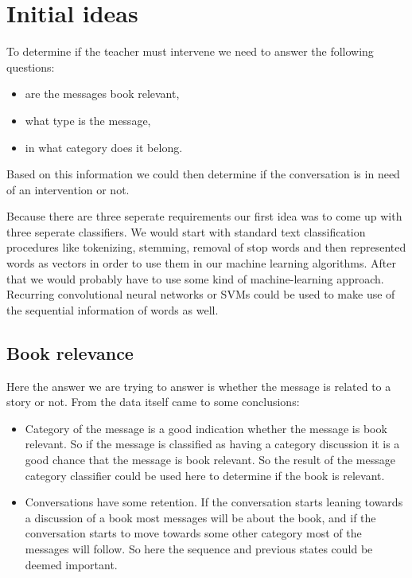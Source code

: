 \documentclass[11pt,a4paper]{article}
\begin{document}
\section{Initial ideas}

To determine if the teacher must intervene we need to answer the following questions:
\begin{itemize}
\item{are the messages book relevant,}
\item{what type is the message,}
\item{in what category does it belong.}
\end{itemize}

Based on this information we could then determine if the conversation is in need of an intervention or not.

Because there are three seperate requirements our first idea was to come up with three seperate classifiers.
We would start with standard text classification procedures like tokenizing, stemming, removal of stop words and then represented words as vectors in order to use them in our machine learning algorithms.
After that we would probably have to use some kind of machine-learning approach. 
Recurring convolutional neural networks or SVMs could be used to make use of the sequential information of words as well.

\subsection{Book relevance}
Here the answer we are trying to answer is whether the message is related to a story or not.
From the data itself came to some conclusions:

\begin{itemize}
\item{Category of the message is a good indication whether the message is book relevant. 
So if the message is classified as having a category discussion it is a good chance that the message is book relevant.
So the result of the message category classifier could be used here to determine if the book is relevant.}
\item{Conversations have some retention.
If the conversation starts leaning towards a discussion of a book most messages will be about the book, and if the conversation starts to move towards some other category most of the messages will follow.
So here the sequence and previous states could be deemed important.}
\end{itemize}
\end{document}
